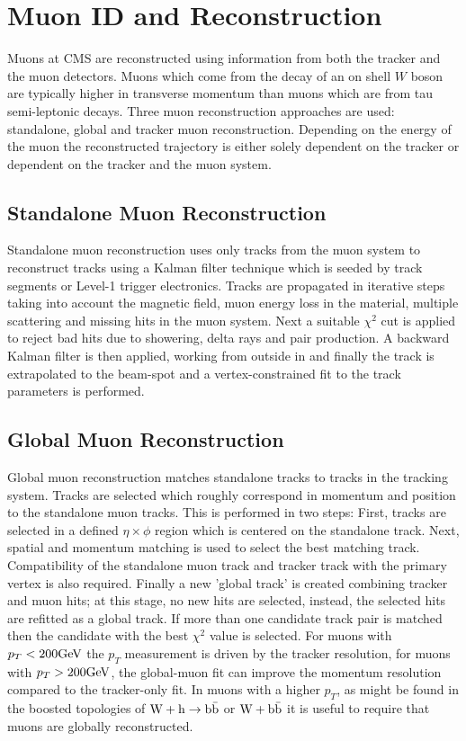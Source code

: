 \section{Muon ID and Reconstruction}
Muons at CMS are reconstructed using information from both the 
tracker and the muon detectors. Muons which come from the decay
of an on shell $W$ boson are typically higher in transverse momentum
than muons which are from tau semi-leptonic decays.
Three muon reconstruction approaches are used: standalone,
global and tracker muon reconstruction. Depending on the 
energy of the muon the reconstructed trajectory is either
solely dependent on the tracker or dependent on the tracker
and the muon system.
\subsection{Standalone Muon Reconstruction}
Standalone muon reconstruction uses only tracks from the muon system
to reconstruct tracks using a Kalman filter technique which is seeded
by track segments or Level-1 trigger electronics. Tracks are propagated
in iterative steps taking into account the magnetic field, muon energy loss in the material,
multiple scattering and missing hits in the muon system.
Next a suitable $\chi^{2}$ cut is applied to reject bad hits due to showering,
delta rays and pair production. A backward Kalman filter is then applied,
working from outside in and finally the track is extrapolated to the 
beam-spot and a vertex-constrained fit to the track
parameters is performed.
\subsection{Global Muon Reconstruction}
Global muon reconstruction matches standalone 
tracks to tracks in the tracking system. 
Tracks are selected which roughly correspond in momentum and position to 
the standalone muon tracks. This is performed in two steps: First,
tracks are selected in a defined $\eta\times\phi$ region which is centered
on the standalone track. Next, spatial and momentum matching is 
used to select the best matching track. Compatibility of the 
standalone muon track and tracker track with the 
primary vertex is also required. Finally a new 'global track' is created combining
tracker and muon hits; at this stage, no new hits are selected, instead, 
the selected hits are refitted as a global track. If more than one candidate
track pair is matched then the candidate with the best $\chi^{2}$ value
is selected. 
For muons with $p_{T}<200\mathrm{GeV}$ the $p_{T}$ measurement is driven
by the tracker resolution, for muons with $p_{T}>200\mathrm{GeV}$,
the global-muon fit can improve the momentum resolution compared
to the tracker-only fit.
In muons with a higher $p_{T}$, as might be found
in the boosted topologies of $\mathrm{W+h\rightarrow\mathrm{b\bar{b}}}$ or $\mathrm{W+\mathrm{b\bar{b}}}$ it is useful to require that muons
are globally reconstructed.
